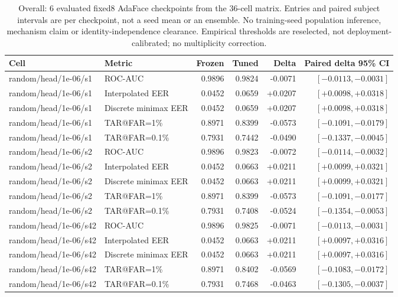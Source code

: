\begin{table}[!t]
\caption{Overall: 6 evaluated fixed8 AdaFace checkpoints from the 36-cell matrix. Entries and paired subject intervals are per checkpoint, not a seed mean or an ensemble. No training-seed population inference, mechanism claim or identity-independence clearance. Empirical thresholds are reselected, not deployment-calibrated; no multiplicity correction.}
\label{tab:strong-fixed8-overall}
\centering\scriptsize
\begin{tabular}{@{}llrrrr@{}}
\toprule
Cell & Metric & Frozen & Tuned & Delta & Paired delta 95\% CI \\
\midrule
random/head/1e-06/s1 & ROC-AUC & 0.9896 & 0.9824 & -0.0071 & $[-0.0113,-0.0031]$ \\
random/head/1e-06/s1 & Interpolated EER & 0.0452 & 0.0659 & +0.0207 & $[+0.0098,+0.0318]$ \\
random/head/1e-06/s1 & Discrete minimax EER & 0.0452 & 0.0659 & +0.0207 & $[+0.0098,+0.0318]$ \\
random/head/1e-06/s1 & TAR@FAR=1\% & 0.8971 & 0.8399 & -0.0573 & $[-0.1091,-0.0179]$ \\
random/head/1e-06/s1 & TAR@FAR=0.1\% & 0.7931 & 0.7442 & -0.0490 & $[-0.1337,-0.0045]$ \\
random/head/1e-06/s2 & ROC-AUC & 0.9896 & 0.9823 & -0.0072 & $[-0.0114,-0.0032]$ \\
random/head/1e-06/s2 & Interpolated EER & 0.0452 & 0.0663 & +0.0211 & $[+0.0099,+0.0321]$ \\
random/head/1e-06/s2 & Discrete minimax EER & 0.0452 & 0.0663 & +0.0211 & $[+0.0099,+0.0321]$ \\
random/head/1e-06/s2 & TAR@FAR=1\% & 0.8971 & 0.8399 & -0.0573 & $[-0.1091,-0.0177]$ \\
random/head/1e-06/s2 & TAR@FAR=0.1\% & 0.7931 & 0.7408 & -0.0524 & $[-0.1354,-0.0053]$ \\
random/head/1e-06/s42 & ROC-AUC & 0.9896 & 0.9825 & -0.0071 & $[-0.0113,-0.0031]$ \\
random/head/1e-06/s42 & Interpolated EER & 0.0452 & 0.0663 & +0.0211 & $[+0.0097,+0.0316]$ \\
random/head/1e-06/s42 & Discrete minimax EER & 0.0452 & 0.0663 & +0.0211 & $[+0.0097,+0.0316]$ \\
random/head/1e-06/s42 & TAR@FAR=1\% & 0.8971 & 0.8402 & -0.0569 & $[-0.1083,-0.0172]$ \\
random/head/1e-06/s42 & TAR@FAR=0.1\% & 0.7931 & 0.7468 & -0.0463 & $[-0.1305,-0.0037]$ \\

\end{tabular}
\end{table}
